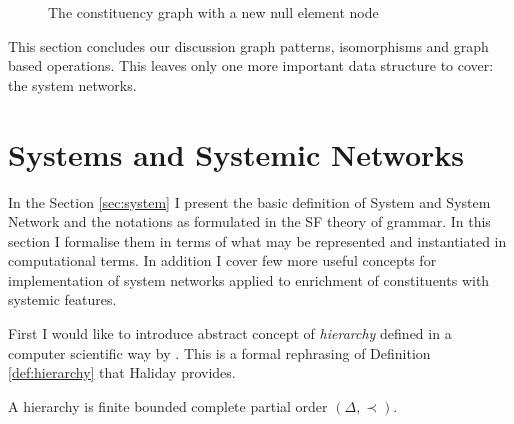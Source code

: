 \begin{figure}[!ht]
	\centering
	\caption{The constituency graph with a new null element node}
	\label{fig:cgg-Albert-example}
\end{figure}


This section concludes our discussion graph patterns, isomorphisms and graph based operations. This leaves only one more important data structure to cover: the system networks. 

\section{Systems and Systemic Networks}
In the Section \ref{sec:system} I present the basic definition of System and System Network and the notations as formulated in the SF theory of grammar. In this section I formalise them in terms of what may be represented and instantiated in computational terms. In addition I cover few more useful concepts for implementation of system networks applied to enrichment of constituents with systemic features. 

First I would like to introduce abstract concept of \textit{hierarchy} defined in a computer scientific way by \citet{Pollard1987}. This is a formal rephrasing of Definition \ref{def:hierarchy} that Haliday provides.

\begin{definition}[Hierarchy]\label{def:hierarchy-cs}
	A hierarchy is finite bounded complete partial order $(\varDelta,\prec)$. 
\end{definition}

